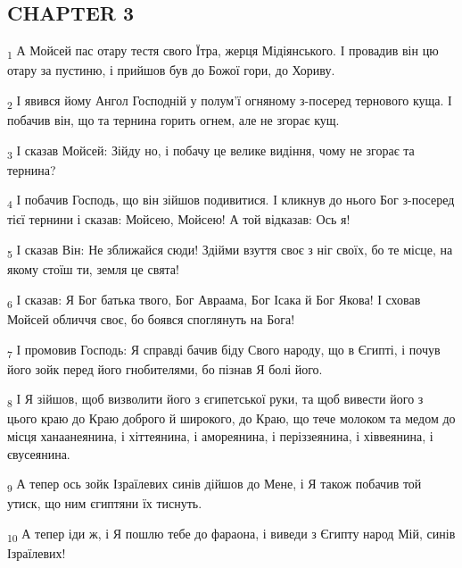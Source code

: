 \subsection{CHAPTER 3}
\begin{tcolorbox}
\textsubscript{1} А Мойсей пас отару тестя свого Їтра, жерця Мідіянського. І провадив він цю отару за пустиню, і прийшов був до Божої гори, до Хориву.
\end{tcolorbox}
\begin{tcolorbox}
\textsubscript{2} І явився йому Ангол Господній у полум'ї огняному з-посеред тернового куща. І побачив він, що та тернина горить огнем, але не згорає кущ.
\end{tcolorbox}
\begin{tcolorbox}
\textsubscript{3} І сказав Мойсей: Зійду но, і побачу це велике видіння, чому не згорає та тернина?
\end{tcolorbox}
\begin{tcolorbox}
\textsubscript{4} І побачив Господь, що він зійшов подивитися. І кликнув до нього Бог з-посеред тієї тернини і сказав: Мойсею, Мойсею! А той відказав: Ось я!
\end{tcolorbox}
\begin{tcolorbox}
\textsubscript{5} І сказав Він: Не зближайся сюди! Здійми взуття своє з ніг своїх, бо те місце, на якому стоїш ти, земля це свята!
\end{tcolorbox}
\begin{tcolorbox}
\textsubscript{6} І сказав: Я Бог батька твого, Бог Авраама, Бог Ісака й Бог Якова! І сховав Мойсей обличчя своє, бо боявся споглянуть на Бога!
\end{tcolorbox}
\begin{tcolorbox}
\textsubscript{7} І промовив Господь: Я справді бачив біду Свого народу, що в Єгипті, і почув його зойк перед його гнобителями, бо пізнав Я болі його.
\end{tcolorbox}
\begin{tcolorbox}
\textsubscript{8} І Я зійшов, щоб визволити його з єгипетської руки, та щоб вивести його з цього краю до Краю доброго й широкого, до Краю, що тече молоком та медом до місця ханаанеянина, і хіттеянина, і амореянина, і періззеянина, і хіввеянина, і євусеянина.
\end{tcolorbox}
\begin{tcolorbox}
\textsubscript{9} А тепер ось зойк Ізраїлевих синів дійшов до Мене, і Я також побачив той утиск, що ним єгиптяни їх тиснуть.
\end{tcolorbox}
\begin{tcolorbox}
\textsubscript{10} А тепер іди ж, і Я пошлю тебе до фараона, і виведи з Єгипту народ Мій, синів Ізраїлевих!
\end{tcolorbox}
